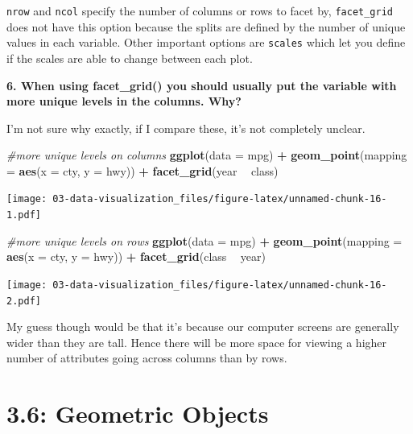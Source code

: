 \documentclass[]{book}
\newenvironment{Shaded}{\begin{snugshade}}{\end{snugshade}}
\newcommand{\CommentTok}[1]{\textcolor[rgb]{0.56,0.35,0.01}{\textit{#1}}}
\newcommand{\DataTypeTok}[1]{\textcolor[rgb]{0.13,0.29,0.53}{#1}}
\newcommand{\KeywordTok}[1]{\textcolor[rgb]{0.13,0.29,0.53}{\textbf{#1}}}
\newcommand{\NormalTok}[1]{#1}
\newcommand{\OperatorTok}[1]{\textcolor[rgb]{0.81,0.36,0.00}{\textbf{#1}}}
\newcommand{\StringTok}[1]{\textcolor[rgb]{0.31,0.60,0.02}{#1}}
\theoremstyle{definition}
\theoremstyle{definition}
\theoremstyle{definition}
\theoremstyle{remark}
\begin{document}
\texttt{nrow} and \texttt{ncol} specify the number of columns or rows to
facet by, \texttt{facet\_grid} does not have this option because the
splits are defined by the number of unique values in each variable.
Other important options are \texttt{scales} which let you define if the
scales are able to change between each plot.

\textbf{6. When using facet\_grid() you should usually put the variable
with more unique levels in the columns. Why?}

I'm not sure why exactly, if I compare these, it's not completely
unclear.

\begin{Shaded}
\begin{Highlighting}[]
\CommentTok{#more unique levels on columns}
\KeywordTok{ggplot}\NormalTok{(}\DataTypeTok{data =}\NormalTok{ mpg) }\OperatorTok{+}\StringTok{ }
\StringTok{  }\KeywordTok{geom_point}\NormalTok{(}\DataTypeTok{mapping =} \KeywordTok{aes}\NormalTok{(}\DataTypeTok{x =}\NormalTok{ cty, }\DataTypeTok{y =}\NormalTok{ hwy)) }\OperatorTok{+}\StringTok{ }
\StringTok{  }\KeywordTok{facet_grid}\NormalTok{(year }\OperatorTok{~}\StringTok{ }\NormalTok{class)}
\end{Highlighting}
\end{Shaded}

\texttt{[image: 03-data-visualization\_files/figure-latex/unnamed-chunk-16-1.pdf]}

\begin{Shaded}
\begin{Highlighting}[]
\CommentTok{#more unique levels on rows}
\KeywordTok{ggplot}\NormalTok{(}\DataTypeTok{data =}\NormalTok{ mpg) }\OperatorTok{+}\StringTok{ }
\StringTok{  }\KeywordTok{geom_point}\NormalTok{(}\DataTypeTok{mapping =} \KeywordTok{aes}\NormalTok{(}\DataTypeTok{x =}\NormalTok{ cty, }\DataTypeTok{y =}\NormalTok{ hwy)) }\OperatorTok{+}\StringTok{ }
\StringTok{  }\KeywordTok{facet_grid}\NormalTok{(class }\OperatorTok{~}\StringTok{ }\NormalTok{year)}
\end{Highlighting}
\end{Shaded}

\texttt{[image: 03-data-visualization\_files/figure-latex/unnamed-chunk-16-2.pdf]}

My guess though would be that it's because our computer screens are
generally wider than they are tall. Hence there will be more space for
viewing a higher number of attributes going across columns than by rows.

\hypertarget{geometric-objects}{%
\section{3.6: Geometric Objects}\label{geometric-objects}}
\end{document}
